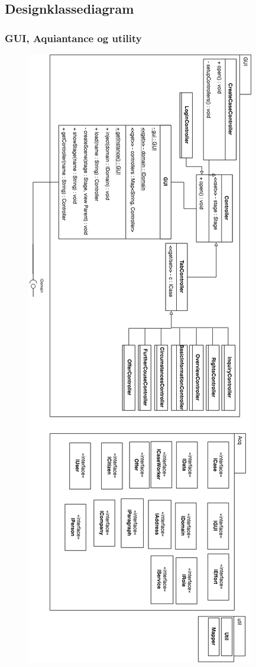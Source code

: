 \documentclass[../main.tex]{subfiles}
\begin{document}
  \subsection{Designklassediagram} \label{designmodel-detaljeret}
  
  \subsubsection{GUI, Aquiantance og utility}
  \begin{figure}[H]
    \centering
    \includegraphics[scale=.34]{figurer/design-gui.png}
    \label{fig:design_gui}
  \end{figure}
  
\end{document}
